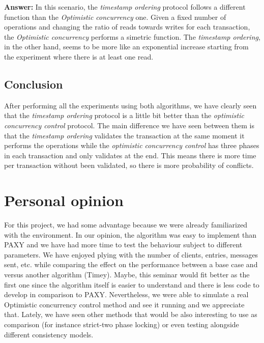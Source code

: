 \documentclass[a4paper, 10pt]{article}
\begin{document}
\begin{enumerate}
\begin{minipage}[H]{\linewidth}
  \label{fig:timey_graph_ratio}
\end{minipage}

\textbf{Answer:} In this scenario, the \textit{timestamp ordering} protocol follows a different function than the \textit{Optimistic concurrency} one. Given a fixed number of operations and changing the ratio of reads towards writes for each transaction, the \textit{Optimistic concurrency} performs a simetric function. The \textit{timestamp ordering}, in the other hand, seems to be more like an exponential increase starting from the experiment where there is at least one read.

\end{enumerate}

\subsection{Conclusion}

After performing all the experiments using both algorithms, we have clearly seen that the \textit{timestamp ordering} protocol is a little bit better than the \textit{optimistic concurrency control} protocol. The main difference we have seen between them is that the \textit{timestamp ordering} validates the transaction at the same moment it performs the operations while the \textit{optimistic concurrency control} has three phases in each transaction and only validates at the end. This means there is more time per transaction without been validated, so there is more probability of conflicts.

\section{Personal opinion}
For this project, we had some advantage because we were already familiarized
with the environment. In our opinion, the algorithm was easy to implement than
PAXY and we have had more time to test the behaviour subject to different
parameters. We have enjoyed plying with the number of clients, entries, messages
sent, etc. while comparing the effect on the performance between a base case and
versus another algorithm (Timey). Maybe, this seminar would fit better as the
first one since the algorithm itself is easier to understand and there is less
code to develop in comparison to PAXY. Nevertheless, we were able to simulate a
real Optimistic concurrency control method and see it running and we appreciate
that. Lately, we have seen other methods that would be also interesting
to use as comparison (for instance strict-two phase locking) or even testing
alongside different consistency models.
\end{document}
